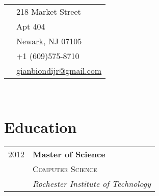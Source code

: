 \documentclass[10pt]{article} %
\begin{document}
{\begin{minipage}[t]{0.5\textwidth}

\end{minipage} %
\hfill
\begin{minipage}[t]{0.44\textwidth} %
\vspace{0pt} %


\colorbox{shade}{\textcolor{text1}{
\begin{tabular}{c|p{7cm}}
  \raisebox{-4pt}{\textifsymbol{18}} 
  & 218 Market Street \\
  & Apt 404 \\
  & Newark, NJ 07105 \\ %
\raisebox{-3pt}{\Mobilefone} 
  & +1 (609)575-8710 \\ %
\raisebox{-1pt}{\Letter} 
  & \href{mailto:gianbiondijr@gmail.com}{gianbiondijr@gmail.com} \\ %
\end{tabular}
}
}\\[10pt]


\section{Education} 

\begin{tabular}{rl} %


2012 & \textbf{Master of Science} \\
& \textsc{Computer Science} \\ 
& \textit{Rochester Institute of Technology}\\
 

\end{tabular}
\end{minipage}}
\end{document}
